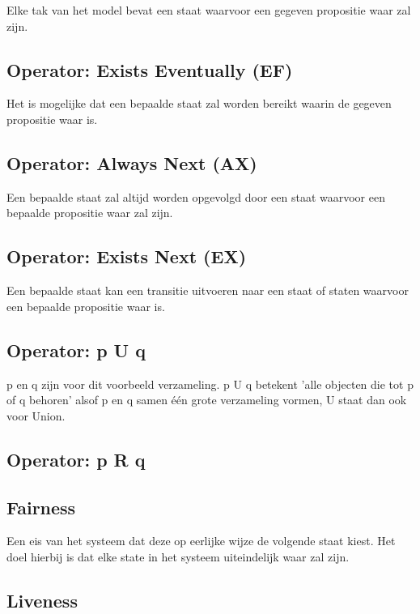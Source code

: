 \documentclass{article}
\begin{document}
Elke tak van het model bevat een staat waarvoor een gegeven propositie waar zal zijn.

\subsection{Operator: Exists Eventually (EF)}

Het is mogelijke dat een bepaalde staat zal worden bereikt waarin de gegeven propositie waar is.

\subsection{Operator: Always Next (AX)}

Een bepaalde staat zal altijd worden opgevolgd door een staat waarvoor een bepaalde propositie waar zal zijn.

\subsection{Operator: Exists Next (EX)}

Een bepaalde staat kan een transitie uitvoeren naar een staat of staten waarvoor een bepaalde propositie waar is.

\subsection{Operator: p U q}

p en q zijn voor dit voorbeeld verzameling. p U q betekent 'alle objecten die tot p of q behoren' alsof p en q samen één grote verzameling vormen, U staat dan ook voor Union.

\subsection{Operator: p R q}

\subsection{Fairness}

Een eis van het systeem dat deze op eerlijke wijze de volgende staat kiest. Het doel hierbij is dat elke state in het systeem uiteindelijk waar zal zijn.

\subsection{Liveness}
\end{document}
